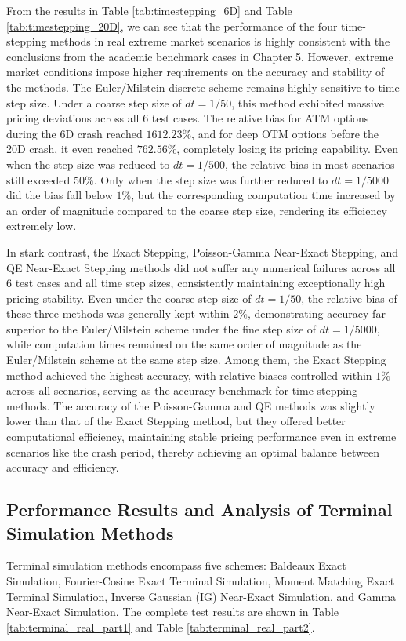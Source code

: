 From the results in Table \ref{tab:timestepping_6D} and Table \ref{tab:timestepping_20D}, we can see that the performance of the four time-stepping methods in real extreme market scenarios is highly consistent with the conclusions from the academic benchmark cases in Chapter 5. However, extreme market conditions impose higher requirements on the accuracy and stability of the methods. The Euler/Milstein discrete scheme remains highly sensitive to time step size. Under a coarse step size of $dt=1/50$, this method exhibited massive pricing deviations across all 6 test cases. The relative bias for ATM options during the 6D crash reached $1612.23\%$, and for deep OTM options before the 20D crash, it even reached $762.56\%$, completely losing its pricing capability. Even when the step size was reduced to $dt=1/500$, the relative bias in most scenarios still exceeded $50\%$. Only when the step size was further reduced to $dt=1/5000$ did the bias fall below $1\%$, but the corresponding computation time increased by an order of magnitude compared to the coarse step size, rendering its efficiency extremely low.

In stark contrast, the Exact Stepping, Poisson-Gamma Near-Exact Stepping, and QE Near-Exact Stepping methods did not suffer any numerical failures across all 6 test cases and all time step sizes, consistently maintaining exceptionally high pricing stability. Even under the coarse step size of $dt=1/50$, the relative bias of these three methods was generally kept within $2\%$, demonstrating accuracy far superior to the Euler/Milstein scheme under the fine step size of $dt=1/5000$, while computation times remained on the same order of magnitude as the Euler/Milstein scheme at the same step size. Among them, the Exact Stepping method achieved the highest accuracy, with relative biases controlled within $1\%$ across all scenarios, serving as the accuracy benchmark for time-stepping methods. The accuracy of the Poisson-Gamma and QE methods was slightly lower than that of the Exact Stepping method, but they offered better computational efficiency, maintaining stable pricing performance even in extreme scenarios like the crash period, thereby achieving an optimal balance between accuracy and efficiency.

\subsection{Performance Results and Analysis of Terminal Simulation Methods}

Terminal simulation methods encompass five schemes: Baldeaux Exact Simulation, Fourier-Cosine Exact Terminal Simulation, Moment Matching Exact Terminal Simulation, Inverse Gaussian (IG) Near-Exact Simulation, and Gamma Near-Exact Simulation. The complete test results are shown in Table \ref{tab:terminal_real_part1} and Table \ref{tab:terminal_real_part2}.

